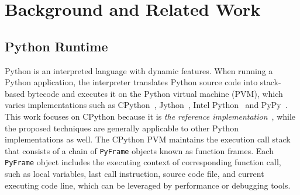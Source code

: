 \section{Background and Related Work}
\label{background}

\subsection{Python Runtime}
\label{sec:prun}

 Python is an interpreted language with dynamic features. When running a Python application, the interpreter translates Python source code into stack-based bytecode and executes it on the Python virtual machine (PVM), which varies implementations such as CPython~\cite{cpython}, Jython~\cite{jpython}, Intel Python~\cite{intelpython} and PyPy~\cite{pypy}. This work focuses on CPython because it is \emph{the  reference implementation}~\cite{pyimplementation}, while
the proposed techniques are generally applicable to other Python implementations as well. %
The CPython PVM maintains the execution call stack that consists of a chain of {\tt PyFrame} objects known as function frames.  Each {\tt PyFrame} object includes the executing context of corresponding function call, such as local variables, last call instruction, source code file, and current executing code line, which can be leveraged by performance or debugging tools.



